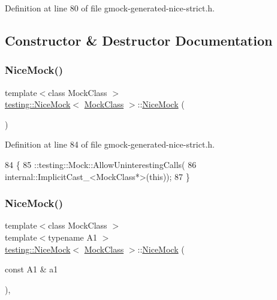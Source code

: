 Definition at line 80 of file gmock-\/generated-\/nice-\/strict.\+h.



\subsection{Constructor \& Destructor Documentation}
\mbox{\label{classtesting_1_1NiceMock_a10bbd6ebe779ac8ab1f9f3ae2dee9310}} 
\subsubsection{\texorpdfstring{Nice\+Mock()}{NiceMock()}\hspace{0.1cm}{\footnotesize\ttfamily [1/11]}}
{\footnotesize\ttfamily template$<$class Mock\+Class $>$ \\
\hyperlink{classtesting_1_1NiceMock}{testing\+::\+Nice\+Mock}$<$ \hyperlink{classMockClass}{Mock\+Class} $>$\+::\hyperlink{classtesting_1_1NiceMock}{Nice\+Mock} (\begin{DoxyParamCaption}{ }\end{DoxyParamCaption})\hspace{0.3cm}{\ttfamily [inline]}}



Definition at line 84 of file gmock-\/generated-\/nice-\/strict.\+h.


\begin{DoxyCode}
84              \{
85     ::testing::Mock::AllowUninterestingCalls(
86         internal::ImplicitCast\_<MockClass*>(\textcolor{keyword}{this}));
87   \}
\end{DoxyCode}
\mbox{\label{classtesting_1_1NiceMock_a2d6b9cb9d929d1af4532b69c7ef19df6}} 
\subsubsection{\texorpdfstring{Nice\+Mock()}{NiceMock()}\hspace{0.1cm}{\footnotesize\ttfamily [2/11]}}
{\footnotesize\ttfamily template$<$class Mock\+Class $>$ \\
template$<$typename A1 $>$ \\
\hyperlink{classtesting_1_1NiceMock}{testing\+::\+Nice\+Mock}$<$ \hyperlink{classMockClass}{Mock\+Class} $>$\+::\hyperlink{classtesting_1_1NiceMock}{Nice\+Mock} (\begin{DoxyParamCaption}\item[{const A1 \&}]{a1 }\end{DoxyParamCaption})\hspace{0.3cm}{\ttfamily [inline]}, {\ttfamily [explicit]}}



